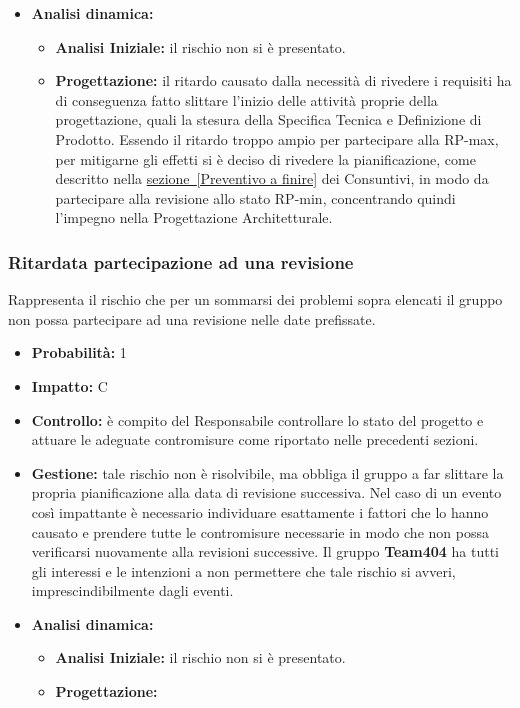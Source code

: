 \documentclass[a4paper,11pt]{article}
\begin{document}
\begin{itemize}
		\item \textbf{Analisi dinamica:}
			\begin{itemize}
				\item\textbf{Analisi Iniziale:} il rischio non si è presentato.
				\item\textbf{Progettazione:} il ritardo causato dalla necessità di rivedere i requisiti ha di conseguenza fatto slittare l'inizio delle attività proprie della progettazione, quali la stesura della Specifica Tecnica e Definizione di Prodotto. Essendo il ritardo troppo ampio per partecipare alla RP-max, per mitigarne gli effetti si è deciso di rivedere la pianificazione, come descritto nella \underline{sezione~\ref{Preventivo a finire}} dei Consuntivi, in modo da partecipare alla revisione allo stato RP-min, concentrando quindi l'impegno nella Progettazione Architetturale.
			\end{itemize}
		\end{itemize}
		\subsubsection{Ritardata partecipazione ad una revisione}							Rappresenta il rischio che per un sommarsi dei problemi sopra elencati il gruppo non possa partecipare ad una revisione nelle date prefissate.
		\begin{itemize}
		\item \textbf{Probabilità:} 1
		\item \textbf{Impatto:} C
		\item \textbf{Controllo:} è compito del Responsabile controllare lo stato del progetto e attuare le adeguate contromisure come riportato nelle precedenti sezioni.
		\item \textbf{Gestione:} tale rischio non è risolvibile, ma obbliga il gruppo a far slittare la propria pianificazione alla data di revisione successiva. Nel caso di un evento così impattante è necessario individuare esattamente i fattori che lo hanno causato e prendere tutte le contromisure necessarie in modo che non possa verificarsi nuovamente alla revisioni successive. Il gruppo \textbf{Team404} ha tutti gli interessi e le intenzioni a non permettere che tale rischio si avveri, imprescindibilmente dagli eventi.
		\item \textbf{Analisi dinamica:}
			\begin{itemize}
				\item\textbf{Analisi Iniziale:} il rischio non si è presentato.
				\item\textbf{Progettazione:}
			\end{itemize}
		\end{itemize}
	\pagebreak	
		
\end{document}
